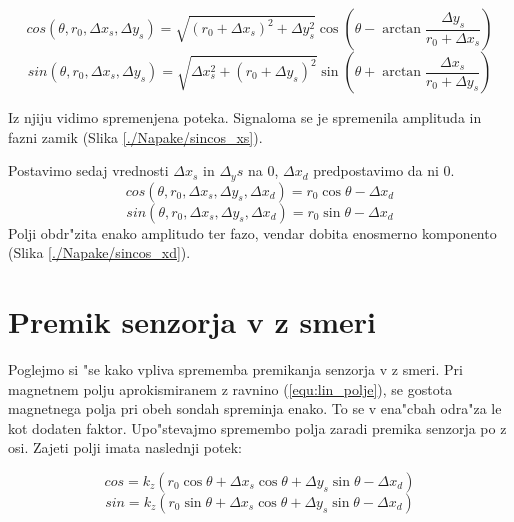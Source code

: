 \begin{equation}
\label{equ:Bx_stat}
cos(\theta,r_0,\Delta x_s, \Delta y_s)= \sqrt{(r_0+\Delta x_s)^2+\Delta y_s^2}\cos(\theta -\arctan \frac{\Delta y_s}{r_0+\Delta x_s})
\end{equation}
\begin{equation}\label{equ:By_stat}
sin(\theta,r_0,\Delta x_s, \Delta y_s)= \sqrt{\Delta x_s^2+(r_0+\Delta y_s)^2} \sin(\theta +\arctan \frac{\Delta x_s}{r_0+\Delta y_s})
\end{equation}

Iz njiju vidimo spremenjena poteka. Signaloma se je spremenila amplituda in fazni zamik (Slika \ref{./Napake/sincos_xs}).

\newpage
Postavimo sedaj vrednosti $\Delta x_s$ in $\Delta_ys$ na 0, $\Delta x_d$ predpostavimo da ni 0.
\begin{equation}
\label{equ:Bx_din}
cos(\theta,r_0,\Delta x_s, \Delta y_s, \Delta x_d)= r_0 \cos\theta-\Delta x_d
\end{equation}
\begin{equation}
\label{equ:By_din}
sin(\theta,r_0,\Delta x_s, \Delta y_s, \Delta x_d)= r_0 \sin\theta-\Delta x_d
\end{equation}
Polji obdr"zita enako amplitudo ter fazo, vendar dobita enosmerno komponento (Slika \ref{./Napake/sincos_xd}).
\newpage
\section{Premik senzorja v z smeri}

Poglejmo si "se kako vpliva sprememba premikanja senzorja v z smeri.
Pri magnetnem polju aprokismiranem z ravnino (\ref{equ:lin_polje}), se gostota magnetnega polja pri obeh sondah spreminja enako. To se v ena"cbah odra"za le kot dodaten faktor. Upo"stevajmo spremembo polja zaradi premika senzorja po z osi. Zajeti polji imata naslednji potek:


\begin{equation}\label{equ:Bx_z}
cos=k_z( r_0 \cos\theta +\Delta x_s \cos\theta +\Delta y_s \sin\theta -\Delta x_d)
\end{equation}
\begin{equation}\label{equ:By_z}
sin=k_z( r_0 \sin\theta +\Delta x_s \cos\theta +\Delta y_s \sin\theta-\Delta x_d)
\end{equation}

